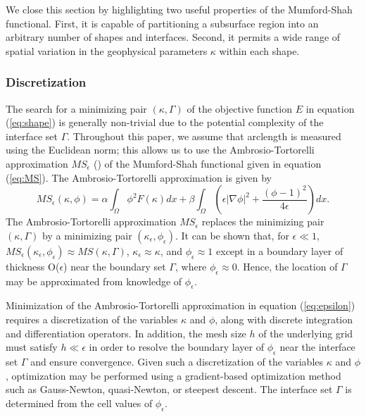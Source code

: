 \documentclass[manuscript,revised]{geophysics}
\begin{document}

We close this section by highlighting two useful properties of the Mumford-Shah functional.  First, it is capable of partitioning a subsurface region into an arbitrary number of shapes and interfaces. Second, it permits a wide range of spatial variation in the geophysical parameters $\kappa$ within each shape.

\subsubsection{Discretization}
The search for a minimizing pair $(\kappa,\Gamma)$ of the objective function $E$ in equation (\ref{eq:shape}) is generally non-trivial due to the potential complexity of the interface set $\Gamma$.  Throughout this paper, we assume that arclength is measured using the Euclidean norm; this allows us to use the Ambrosio-Tortorelli approximation $MS_\epsilon$ (\cite{Ambrosio_1992}) of the Mumford-Shah functional given in equation (\ref{eq:MS}).  The Ambrosio-Tortorelli approximation is given by %
\begin{equation} \label{eq:epsilon}
MS_\epsilon (\kappa,\phi)=\alpha \int_\Omega \phi^2 F(\kappa) dx + \beta \int_\Omega  \left( \epsilon \left\vert \nabla \phi \right\vert^2+\frac{(\phi-1)^2}{4\epsilon} \right)   dx.	
\end{equation}
The Ambrosio-Tortorelli approximation $MS_\epsilon$ replaces the minimizing pair $(\kappa,\Gamma)$ by a minimizing pair $(\kappa_\epsilon,\phi_\epsilon)$.  It can be shown that, for $\epsilon \ll 1$,  $ MS_\epsilon (\kappa_\epsilon,\phi_\epsilon ) \approx MS(\kappa,\Gamma)$, $\kappa_\epsilon \approx \kappa$, and $\phi_\epsilon \approx 1$ except in a boundary layer of thickness O($\epsilon$)  near the boundary set $\Gamma$, where $\phi_\epsilon \approx 0$.  Hence, the location of $\Gamma$ may be approximated from knowledge of $\phi_\epsilon$.  

Minimization of the Ambrosio-Tortorelli approximation in equation (\ref{eq:epsilon}) requires a discretization of the variables $\kappa$ and $\phi$, along with discrete integration and differentiation operators.  In addition, the mesh size $h$ of the underlying grid must satisfy $h\ll\epsilon$ in order to resolve the boundary layer of $\phi_\epsilon$ near the interface set $\Gamma$ and ensure convergence.  Given such a discretization of the variables $\kappa$ and $\phi$, optimization may be performed using a gradient-based optimization method such as Gauss-Newton, quasi-Newton, or steepest descent.  The interface set $\Gamma$ is determined from the cell values of $\phi_\epsilon$.
\end{document}
